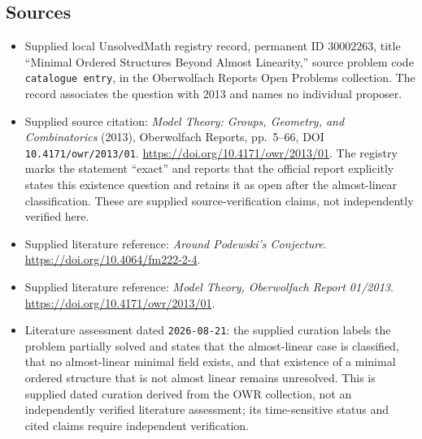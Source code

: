\documentclass[11pt]{article}
\begin{document}
\subsection{Sources}
\begin{itemize}
\item Supplied local UnsolvedMath registry record, permanent ID \(30002263\), title ``Minimal Ordered Structures Beyond Almost Linearity,'' source problem code \texttt{catalogue entry}, in the Oberwolfach Reports Open Problems collection. The record associates the question with 2013 and names no individual proposer.
\item Supplied source citation: \emph{Model Theory: Groups, Geometry, and Combinatorics} (2013), Oberwolfach Reports, pp.\ 5--66, DOI \texttt{10.4171/owr/2013/01}. \url{https://doi.org/10.4171/owr/2013/01}. The registry marks the statement ``exact'' and reports that the official report explicitly states this existence question and retains it as open after the almost-linear classification. These are supplied source-verification claims, not independently verified here.
\item Supplied literature reference: \emph{Around Podewski's Conjecture}. \url{https://doi.org/10.4064/fm222-2-4}.
\item Supplied literature reference: \emph{Model Theory, Oberwolfach Report 01/2013}. \url{https://doi.org/10.4171/owr/2013/01}.
\item Literature assessment dated \texttt{2026-08-21}: the supplied curation labels the problem partially solved and states that the almost-linear case is classified, that no almost-linear minimal field exists, and that existence of a minimal ordered structure that is not almost linear remains unresolved. This is supplied dated curation derived from the OWR collection, not an independently verified literature assessment; its time-sensitive status and cited claims require independent verification.
\end{itemize}
\end{document}
